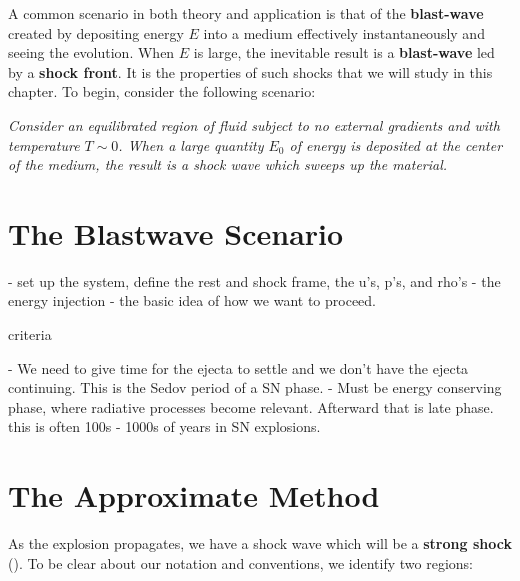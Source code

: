 A common scenario in both theory and application is that of the \textbf{blast-wave} created by depositing energy $E$ into a medium effectively instantaneously and seeing the evolution. When $E$ is large, the inevitable result is a \textbf{blast-wave} led by a \textbf{shock front}. It is the properties of such shocks that we will study in this chapter. To begin, consider the following scenario:

\begin{center}
    \textit{Consider an equilibrated region of fluid subject to no external gradients and with temperature $T \sim 0$. When a large quantity $E_0$ of energy is deposited at the center of the medium, the result is a shock wave which sweeps up the material.}
\end{center}

\section{The Blastwave Scenario}

- set up the system, define the rest and shock frame, the u's, p's, and rho's
- the energy injection 
- the basic idea of how we want to proceed.

criteria

- We need to give time for the ejecta to settle and we don't have the ejecta continuing. This is the
  Sedov period of a SN phase.
- Must be energy conserving phase, where radiative processes become relevant. Afterward that is late phase.
  this is often 100s - 1000s of years in SN explosions.

\section{The Approximate Method}

As the explosion propagates, we have a shock wave which will be a \textbf{strong shock} (). To be clear about our notation and conventions, we identify two regions:
\vspace{0.25cm}


